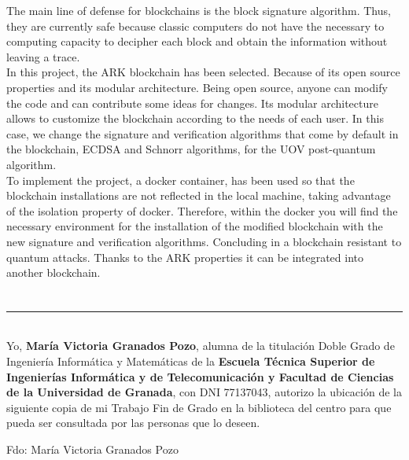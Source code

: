 The main line of defense for blockchains is the block signature algorithm. Thus, they are currently safe because classic computers do not have the necessary to computing capacity to decipher each block and obtain the information without leaving a trace.\\

In this project, the ARK blockchain has been selected. Because of its open source properties and its modular architecture. Being open source, anyone can modify the code and can contribute some ideas for changes. Its modular architecture allows to customize the blockchain according to the needs of each user. In this case, we change the signature and verification algorithms that come by default in the blockchain, ECDSA and Schnorr algorithms, for the UOV post-quantum algorithm.\\

To implement the project, a docker container, has been used so that the blockchain installations are not reflected in the local machine, taking advantage of the isolation property of docker. Therefore, within the docker you will find the necessary environment for the installation of the modified blockchain with the new signature and verification algorithms. Concluding in a blockchain resistant to quantum attacks. Thanks to the ARK properties it can be integrated into another blockchain.\\




\chapter*{}
\thispagestyle{empty}

\noindent\rule[-1ex]{\textwidth}{2pt}\\[4.5ex]

Yo, \textbf{María Victoria Granados Pozo}, alumna de la titulación Doble Grado de Ingeniería Informática y Matemáticas de la \textbf{Escuela Técnica Superior
de Ingenierías Informática y de Telecomunicación y Facultad de Ciencias de la Universidad de Granada}, con DNI 77137043, autorizo la
ubicación de la siguiente copia de mi Trabajo Fin de Grado en la biblioteca del centro para que pueda ser
consultada por las personas que lo deseen.

\vspace{6cm}

\noindent Fdo: María Victoria Granados Pozo

\vspace{2cm}


